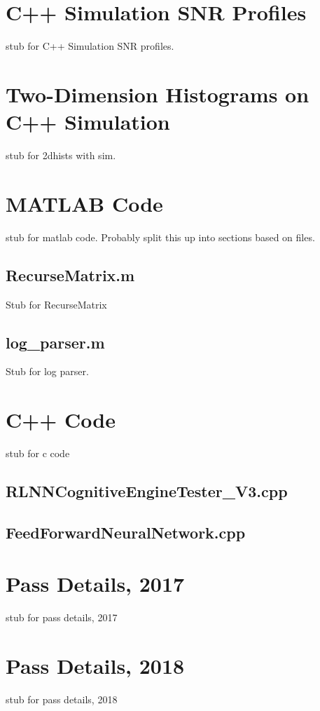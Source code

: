 
\begin{appendices}
\chapter{C++ Simulation SNR Profiles}\label{app:cSNRProfiles_all}
\par stub for C++ Simulation SNR profiles.

\chapter{Two-Dimension Histograms on C++ Simulation}\label{app:2dHistSim}
\par stub for 2dhists with sim.

\chapter{MATLAB Code}\label{app:MatlabCode}
\par stub for matlab code. Probably split this up into sections based on files.
\section{RecurseMatrix.m}\label{app:MatlabCode:recurseMatrix}
\par Stub for RecurseMatrix

\section{log\_parser.m}\label{app:MatlabCode:parser}
\par Stub for log parser.

\chapter{C++ Code} \label{app:CppCode}
\par stub for c code
\section{RLNNCognitiveEngineTester\_V3.cpp}\label{app:CppCode:cogEngTesterV3}


\section{FeedForwardNeuralNetwork.cpp} \label{app:CppCode:ffnn}


\chapter{Pass Details, 2017}
\par stub for pass details, 2017
\chapter{Pass Details, 2018}
\par stub for pass details, 2018



\end{appendices}